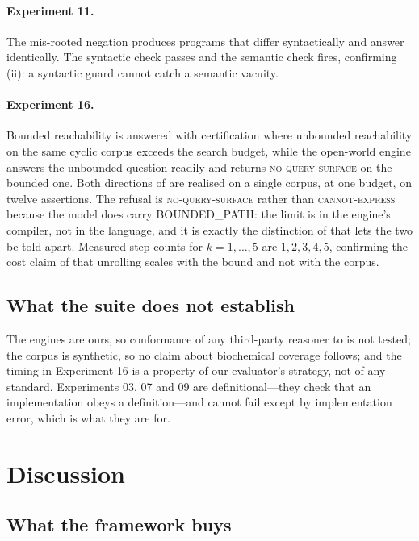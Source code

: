 \documentclass[11pt,a4paper]{article}
\theoremstyle{plain}
\theoremstyle{definition}
\theoremstyle{remark}
\newcommand{\vexp}{\textsc{cannot-express}}
\newcommand{\vsurf}{\textsc{no-query-surface}}
\begin{document}
\paragraph{Experiment 11.} The mis-rooted negation produces programs that
differ syntactically and answer identically. The syntactic check passes and the
semantic check fires, confirming (ii): a syntactic guard
cannot catch a semantic vacuity.

\paragraph{Experiment 16.} Bounded reachability is answered with certification
where unbounded reachability on the same cyclic corpus exceeds the search
budget, while the open-world engine answers the unbounded question readily and
returns \vsurf{} on the bounded one. Both directions of  are
realised on a single corpus, at one budget, on twelve assertions. The refusal
is \vsurf{} rather than \vexp{} because the model does carry
\textsf{BOUNDED\_PATH}: the limit is in the engine's compiler, not in the
language, and it is exactly the distinction of  that
lets the two be told apart. Measured step counts for $k = 1,\dots,5$ are
$1,2,3,4,5$, confirming the cost claim of  that
unrolling scales with the bound and not with the corpus.

\subsection{What the suite does not establish}

The engines are ours, so conformance of any third-party reasoner to
 is not tested; the corpus is synthetic, so no claim about
biochemical coverage follows; and the timing in Experiment 16 is a property of
our evaluator's strategy, not of any standard. Experiments 03, 07 and 09 are
definitional---they check that an implementation obeys a definition---and
cannot fail except by implementation error, which is what they are for.

\section{Discussion}
\label{sec:discussion}

\subsection{What the framework buys}
\end{document}
